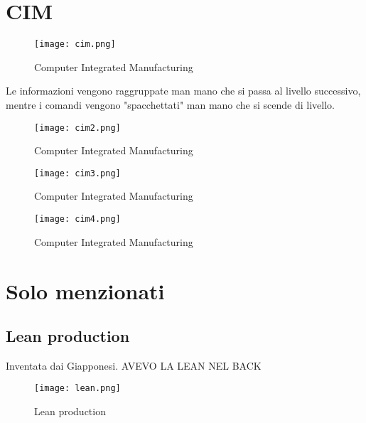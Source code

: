 \documentclass[../main.tex]{subfiles}
\begin{document}
\newpage
\section{CIM}
\begin{figure}[h!]
    \centering
    \texttt{[image: cim.png]}
    \caption{Computer Integrated Manufacturing}
\end{figure}
Le informazioni vengono raggruppate man mano che si passa al livello successivo, mentre i comandi vengono "spacchettati" man mano che si scende di livello.
\begin{figure}[h!]
    \centering
    \texttt{[image: cim2.png]}
    \caption{Computer Integrated Manufacturing}
\end{figure}
\begin{figure}
    \centering
    \texttt{[image: cim3.png]}
    \caption{Computer Integrated Manufacturing}
\end{figure}
\begin{figure}
    \centering
    \texttt{[image: cim4.png]}
    \caption{Computer Integrated Manufacturing}
\end{figure}

\section{Solo menzionati}
\subsection{Lean production}
Inventata dai Giapponesi. AVEVO LA LEAN NEL BACK
\begin{figure}[h!]
    \centering
    \texttt{[image: lean.png]}
    \caption{Lean production}
\end{figure}
\end{document}
